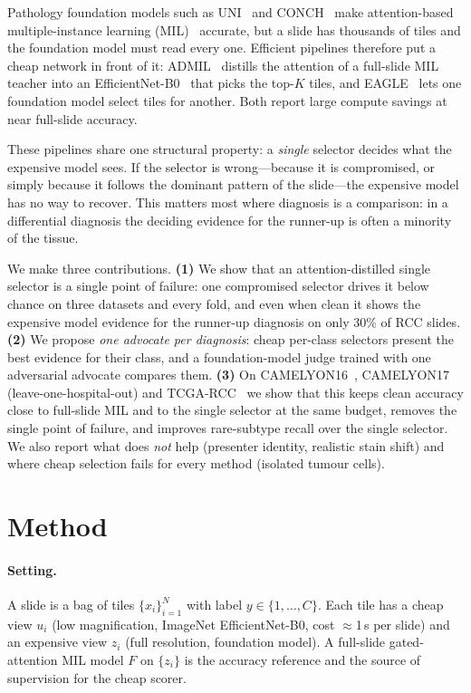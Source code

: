 \documentclass[runningheads]{llncs}
\begin{document}
Pathology foundation models such as UNI~\cite{uni} and CONCH~\cite{conch} make attention-based multiple-instance learning (MIL)~\cite{ilse2018abmil,lu2021data} accurate, but a slide has thousands of tiles and the foundation model must read every one. Efficient pipelines therefore put a cheap network in front of it: ADMIL~\cite{admil2026} distills the attention of a full-slide MIL teacher into an EfficientNet-B0~\cite{tan2019efficientnet} that picks the top-$K$ tiles, and EAGLE~\cite{eagle2026} lets one foundation model select tiles for another. Both report large compute savings at near full-slide accuracy.

These pipelines share one structural property: a \emph{single} selector decides what the expensive model sees. If the selector is wrong---because it is compromised, or simply because it follows the dominant pattern of the slide---the expensive model has no way to recover. This matters most where diagnosis is a comparison: in a differential diagnosis the deciding evidence for the runner-up is often a minority of the tissue.

We make three contributions. \textbf{(1)} We show that an attention-distilled single selector is a single point of failure: one compromised selector drives it below chance on three datasets and every fold, and even when clean it shows the expensive model evidence for the runner-up diagnosis on only 30\% of RCC slides. \textbf{(2)} We propose \emph{one advocate per diagnosis}: cheap per-class selectors present the best evidence for their class, and a foundation-model judge trained with one adversarial advocate compares them. \textbf{(3)} On CAMELYON16~\cite{c16}, CAMELYON17~\cite{camelyon17} (leave-one-hospital-out) and TCGA-RCC~\cite{tcga} we show that this keeps clean accuracy close to full-slide MIL and to the single selector at the same budget, removes the single point of failure, and improves rare-subtype recall over the single selector. We also report what does \emph{not} help (presenter identity, realistic stain shift) and where cheap selection fails for every method (isolated tumour cells).

\section{Method}
\paragraph{Setting.} A slide is a bag of tiles $\{x_i\}_{i=1}^N$ with label $y\in\{1,\dots,C\}$. Each tile has a cheap view $u_i$ (low magnification, ImageNet EfficientNet-B0, cost $\approx$1\,s per slide) and an expensive view $z_i$ (full resolution, foundation model). A full-slide gated-attention MIL model $F$ on $\{z_i\}$ is the accuracy reference and the source of supervision for the cheap scorer.
\end{document}
